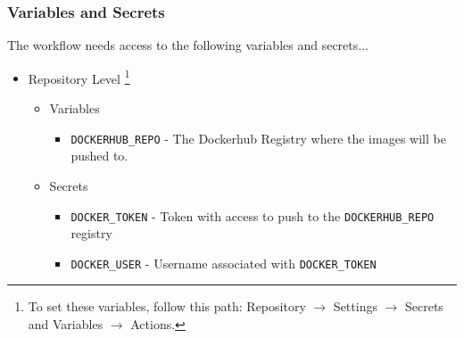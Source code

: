 \documentclass[a4paper,11pt]{article}
\begin{document}
\subsubsection{Variables and Secrets}
The workflow needs access to the following variables and secrets...
\begin{itemize}
    \item Repository Level \footnote{To set these variables, follow this path: Repository $\rightarrow$ Settings $\rightarrow$ Secrets and Variables $\rightarrow$ Actions.}
    \begin{itemize}
        \item Variables
        \begin{itemize}
            \item\verb|DOCKERHUB_REPO| - The Dockerhub Registry where the images will be pushed to.
        \end{itemize}
        \item Secrets
        \begin{itemize}
            \item\verb|DOCKER_TOKEN| - Token with access to push to the \verb|DOCKERHUB_REPO| registry
            \item\verb|DOCKER_USER| - Username associated with \verb|DOCKER_TOKEN|
        \end{itemize}
    \end{itemize}
\end{itemize}
\end{document}

